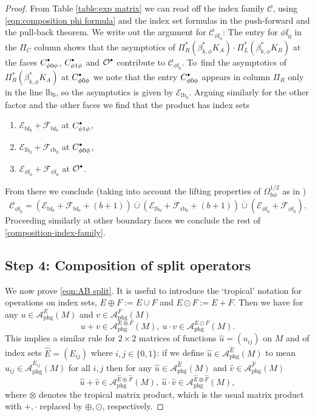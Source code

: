 \documentclass[JEP,XML,SOM,Unicode,NoFloatCountersInSection,published]{cedram}
\newcommand{\bbullet}{{\scriptscriptstyle\bullet}}
\newcommand{\sbullet}{{\raisebox{1pt}{$\bbullet$}}}
\newcommand{\bphi}{{\bb\phi}}
\theoremstyle{plain}
\theoremstyle{definition}
\newcommand\calA{{\mathcal A}}
\newcommand\calC{{\mathcal C}}
\newcommand\calE{{\mathcal E}}
\newcommand\calO{{\mathcal O}}
\newcommand {\phg}{{\mathrm{phg}}}
\newcommand{\phif}{{\phi\mathrm{f}}}
\newcommand{\lf}{{\mathrm{lb}}}
\newcommand{\rf}{{\mathrm{rb}}}
\newcommand{\bb}{{\mathrm{b}}}
\newcommand{\bbf}{{\mathrm{bf}}}
\newcommand{\Ewhat}{{\widehat{E}}}
\newcommand{\Fwhat}{{\widehat{F}}}
\newcommand {\uhat} {{\hat{u}}}
\newcommand {\vhat} {{\hat{v}}}
\begin{document}
\begin{proof}
From Table \ref{table:exp matrix} we can read off the index family $\mathscr{C}$, using \eqref{eqn:composition phi formula} and the index set formulas in the push-forward and the pull-back theorem. We write out the argument for $\mathscr{C}_{\phif_0}$:
The entry for $\phif_0$ in the $\Pi_C$ column shows that the asymptotics of $ \Pi_{R}^{*}(\beta_{k,\phi}^* K_{A}) \cdot
\Pi_{L}^{*}(\beta_{k,\phi}^* K_{B})$ at the faces $C_{\phi0\phi}^\sbullet$, $C_{\phi1\phi}^\sbullet$ and $\calO^\sbullet$ contribute to $\calC_{\phif_0}$.
To~find the asymptotics of $\Pi_{R}^{*}(\beta_{k,\phi}^* K_{A})$ at
$C_{\phi0\phi}^\sbullet$ we note that the entry $C_{\phi0\phi}^\sbullet$ appears in column $\Pi_R$ only in the line $\lf_0$, so the asymptotics is given by $\calE_{\lf_0}$. Arguing similarly for the other factor and the other faces we find that the product has index sets
\begin{enumerate}
\item $\mathcal{E}_{\bbf_0} + \mathcal{F}_{\bbf_0}$ at $C_{\phi1\phi}^\sbullet$,
\item $\mathcal{E}_{\lf_0} + \mathcal{F}_{\rf_0}$ at $C_{\phi0\phi}^\sbullet$,
\item $\mathcal{E}_{\phif_0} + \mathcal{F}_{\phif_0}$ at $\calO^\sbullet$.
\end{enumerate}
From there we conclude (taking into account the
lifting properties of $\Omega_{\bphi}^{1/2} $ as in \cite[Th.\,9]{grieser-para})
\[
\mathscr{C}_{\phif_0} = \left(\mathcal{E}_{\bbf_0} + \mathcal{F}_{\bbf_0} + (b+1)\right)
\overline{\cup} \left(\mathcal{E}_{\lf_0} + \mathcal{F}_{\rf_0} + (b+1)\right)
\overline{\cup}(\mathcal{E}_{\phif_0} + \mathcal{F}_{\phif_0}).
\]
Proceeding similarly at other boundary faces we conclude the rest of \eqref{composition-index-family}.

\subsection*{Step 4: Composition of split operators}
We now prove \eqref{eqn:AB split}.
It is useful to intro\-duce the `tropical' notation for operations on index sets, $E\oplus F:=E \cup F$ and \hbox{$E\odot F:= E+F$}. Then we have for any $ u\in \calA^E_{\phg}(M)$ and $v\in \calA^F_{\phg}(M)$
\[
u+v\in\calA^{E\oplus F}_{\phg}(M),\
u\cdot v \in \calA^{E\odot F}_{\phg}(M).
\]
This implies a similar rule for $2\times2$ matrices of functions $\uhat=(u_{ij})$ on $M$ and of index sets $\Ewhat=(E_{ij})$ where $i,j\in\{0,1\}$: if we define $\uhat\in\calA^\Ewhat_{\phg}(M)$ to mean
$u_{ij}\in\calA^{E_{ij}}_{\phg}(M)$ for all $i,j$ then for any
$\uhat\in \calA^\Ewhat_{\phg}(M)$ and $\vhat\in \calA^\Fwhat_{\phg}(M)$
\[
\uhat+\vhat\in\calA^{\Ewhat\oplus \Fwhat}_{\phg}(M),\
\uhat\cdot\vhat \in \calA^{\Ewhat\otimes \Fwhat}_{\phg}(M),
\]
where $\otimes$ denotes the tropical matrix product, which is the usual matrix product with
$+,\cdot$ replaced by $\oplus,\odot$, respectively.


\end{proof}
\end{document}
